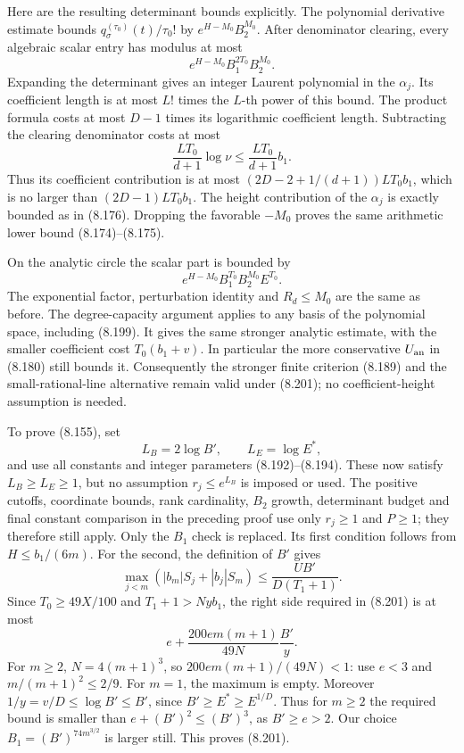 \documentclass[
  11pt,
  a4paper,
]{article}
\begin{document}
Here are the resulting determinant bounds explicitly. The polynomial
derivative estimate bounds \(q_\sigma^{(\tau_0)}(t)/\tau_0!\) by
\(e^{H-M_0}B_2^{M_0}\). After denominator clearing, every algebraic
scalar entry has modulus at most \[
e^{H-M_0}B_1^{2T_0}B_2^{M_0}.
\] Expanding the determinant gives an integer Laurent polynomial in the
\(\alpha_j\). Its coefficient length is at most \(L!\) times the
\(L\)-th power of this bound. The product formula costs at most \(D-1\)
times its logarithmic coefficient length. Subtracting the clearing
denominator costs at most \[
\frac{LT_0}{d+1}\log\nu\le\frac{LT_0}{d+1}b_1.
\] Thus its coefficient contribution is at most
\((2D-2+1/(d+1))LT_0b_1\), which is no larger than \((2D-1)LT_0b_1\).
The height contribution of the \(\alpha_j\) is exactly bounded as in
(8.176). Dropping the favorable \(-M_0\) proves the same arithmetic
lower bound (8.174)--(8.175).

On the analytic circle the scalar part is bounded by \[
e^{H-M_0}B_1^{T_0}B_2^{M_0}E^{T_0}.
\] The exponential factor, perturbation identity and \(R_d\le M_0\) are
the same as before. The degree-capacity argument applies to any basis of
the polynomial space, including (8.199). It gives the same stronger
analytic estimate, with the smaller coefficient cost \(T_0(b_1+v)\). In
particular the more conservative \(U_{\rm an}\) in (8.180) still bounds
it. Consequently the stronger finite criterion (8.189) and the
small-rational-line alternative remain valid under (8.201); no
coefficient-height assumption is needed.

To prove (8.155), set \[
L_B=2\log B',\qquad L_E=\log E^*,
\] and use all constants and integer parameters (8.192)--(8.194). These
now satisfy \(L_B\ge L_E\ge1\), but no assumption \(r_j\le e^{L_B}\) is
imposed or used. The positive cutoffs, coordinate bounds, rank
cardinality, \(B_2\) growth, determinant budget and final constant
comparison in the preceding proof use only \(r_j\ge1\) and \(P\ge1\);
they therefore still apply. Only the \(B_1\) check is replaced. Its
first condition follows from \(H\le b_1/(6m)\). For the second, the
definition of \(B'\) gives \[
\max_{j<m}(|b_m|S_j+|b_j|S_m)
\le\frac{UB'}{D(T_1+1)}.
\] Since \(T_0\ge49X/100\) and \(T_1+1>Nyb_1\), the right side required
in (8.201) is at most \[
e+\frac{200em(m+1)}{49N}\frac{B'}y.
\] For \(m\ge2\), \(N=4(m+1)^3\), so \(200em(m+1)/(49N)<1\): use \(e<3\)
and \(m/(m+1)^2\le2/9\). For \(m=1\), the maximum is empty. Moreover
\(1/y=v/D\le\log B'\le B'\), since \(B'\ge E^*\ge E^{1/D}\). Thus for
\(m\ge2\) the required bound is smaller than \(e+(B')^2\le(B')^3\), as
\(B'\ge e>2\). Our choice \(B_1=(B')^{74m^{3/2}}\) is larger still. This
proves (8.201).
\end{document}
